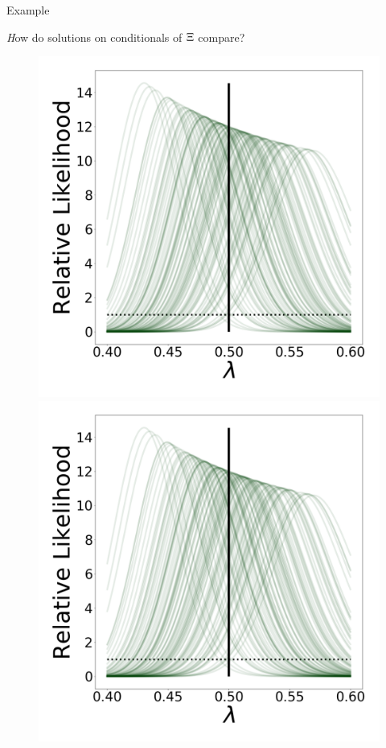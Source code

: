 \begin{block}{Example}
\vspace{1cm}

{\emph How do solutions on conditionals of $\operatorname*{\Xi}$ compare?}
\vspace{-0.5cm}
    \begin{figure}
        \includegraphics[width=13cm]{figures/updated_stability_D10_sigma-10E-4}
        \includegraphics[width=13cm]{figures/updated_stability_D10_sigma-10E-4}\\

\end{figure}
\end{block}
